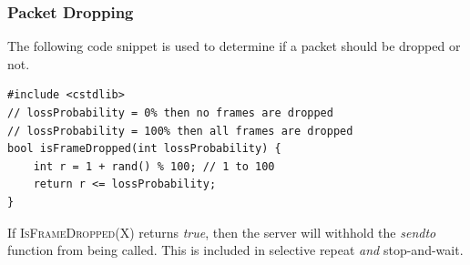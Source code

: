 \documentclass[runningheads]{llncs}
\begin{document}
\subsubsection{Packet Dropping}
The following code snippet is used to determine if a packet should be dropped or not.
\begin{lstlisting}
#include <cstdlib>
// lossProbability = 0% then no frames are dropped
// lossProbability = 100% then all frames are dropped
bool isFrameDropped(int lossProbability) {
    int r = 1 + rand() % 100; // 1 to 100
    return r <= lossProbability;
}
\end{lstlisting}
If \textsc{IsFrameDropped(X)} returns \emph{true}, then the server will withhold the \emph{sendto} function from being called. This is included in selective repeat \emph{and} stop-and-wait.
\end{document}
